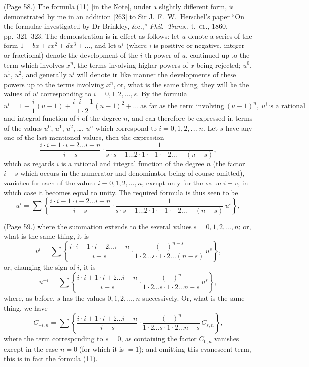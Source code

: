 \documentclass[11pt,a4paper]{article}
\begin{document}
\medskip

\noindent (Page 58.) The formula (11) [in the Note], under a slightly different form, is demonstrated by me in an addition [263] to Sir J.~F.~W.\ Herschel's paper ``On the formulae investigated by Dr Brinkley, \&c.,'' \textit{Phil.\ Trans.}, t.~\textsc{cl}., 1860, pp.~321--323. The demonstration is in effect as follows: let $u$ denote a series of the form $1 + bx + cx^2 + dx^3 + \ldots$, and let $u^i$ (where $i$ is positive or negative, integer or fractional) denote the development of the $i$-th power of $u$, continued up to the term which involves $x^n$, the terms involving higher powers of $x$ being rejected; $u^0$, $u^1$, $u^2$, and generally $u^i$ will denote in like manner the developments of these powers up to the terms involving $x^n$, or, what is the same thing, they will be the values of $u^i$ corresponding to $i = 0, 1, 2, \ldots, s$. By the formula
\[
u^i = 1 + \frac{i}{1}(u - 1) + \frac{i \cdot i - 1}{1 \cdot 2}(u - 1)^2 + \ldots \ \text{as far as the term involving}\ (u - 1)^n,\ u^i\ \text{is a rational}
\]
and integral function of $i$ of the degree $n$, and can therefore be expressed in terms of the values $u^0$, $u^1$, $u^2$, \ldots, $u^n$ which correspond to $i = 0, 1, 2, \ldots, n$. Let $s$ have any one of the last-mentioned values, then the expression
\[
\frac{i \cdot i - 1 \cdot i - 2 \ldots i - n}{i - s} \cdot \frac{1}{s \cdot s - 1 \ldots 2 \cdot 1 \cdot -1 \cdot -2 \ldots -(n - s)},
\]
which as regards $i$ is a rational and integral function of the degree $n$ (the factor $i - s$ which occurs in the numerator and denominator being of course omitted), vanishes for each of the values $i = 0, 1, 2, \ldots, n$, except only for the value $i = s$, in which case it becomes equal to unity. The required formula is thus seen to be
\[
u^i = \sum \left\{ \frac{i \cdot i - 1 \cdot i - 2 \ldots i - n}{i - s} \cdot \frac{1}{s \cdot s - 1 \ldots 2 \cdot 1 \cdot -1 \cdot -2 \ldots -(n - s)}\, u^s \right\},
\]

\bigskip

\noindent (Page 59.) where the summation extends to the several values $s = 0, 1, 2, \ldots, n$; or, what is the same thing, it is
\[
u^i = \sum \left\{ \frac{i \cdot i - 1 \cdot i - 2 \ldots i - n}{i - s} \cdot \frac{(-)^{n - s}}{1 \cdot 2 \ldots s \cdot 1 \cdot 2 \ldots (n - s)}\, u^s \right\},
\]
or, changing the sign of $i$, it is
\[
u^{-i} = \sum \left\{ \frac{i \cdot i + 1 \cdot i + 2 \ldots i + n}{i + s} \cdot \frac{(-)^n}{1 \cdot 2 \ldots s \cdot 1 \cdot 2 \ldots n - s}\, u^s \right\},
\]
where, as before, $s$ has the values $0, 1, 2, \ldots, n$ successively. Or, what is the same thing, we have
\[
C_{-i, n} = \sum \left\{ \frac{i \cdot i + 1 \cdot i + 2 \ldots i + n}{i + s} \cdot \frac{(-)^n}{1 \cdot 2 \ldots s \cdot 1 \cdot 2 \ldots n - s}\, C_{s, n} \right\},
\]
where the term corresponding to $s = 0$, as containing the factor $C_{0, n}$ vanishes except in the case $n = 0$ (for which it is $= 1$); and omitting this evanescent term, this is in fact the formula (11).
\end{document}
